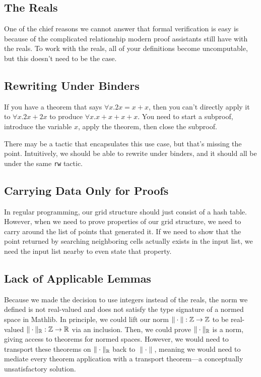 \documentclass{article}
\begin{document}
\subsection{The Reals}
One of the chief reasons we cannot answer that formal verification is easy is because of the complicated relationship modern proof assistants still have with the reals.
To work with the reals, all of your definitions become uncomputable, but this doesn't need to be the case.

\subsection{Rewriting Under Binders}
If you have a theorem that says $\forall x. 2x = x + x$, then you can't directly apply it to $\forall x. 2x + 2x$ to produce $\forall x. x + x + x + x$.
You need to start a subproof, introduce the variable $x$, apply the theorem, then close the subproof.

There may be a tactic that encapsulates this use case, but that's missing the point.
Intuitively, we should be able to rewrite under binders, and it should all be under the same \texttt{rw} tactic.

\subsection{Carrying Data Only for Proofs}
In regular programming, our grid structure should just consist of a hash table.
However, when we need to prove properties of our grid structure, we need to carry around the list of points that generated it.
If we need to show that the point returned by searching neighboring cells actually exists in the input list, we need the input list nearby to even state that property.

\subsection{Lack of Applicable Lemmas}
Because we made the decision to use integers instead of the reals, the norm we defined is not real-valued and does not satisfy the type signature of a normed space in Mathlib.  
In principle, we could lift our norm $\| \cdot \| : \mathbb{Z} \to \mathbb{Z}$ to be real-valued $\| \cdot \|_{\mathbb{R}} : \mathbb{Z} \to \mathbb{R}$ via an inclusion.
Then, we could prove $\| \cdot \|_{\mathbb{R}}$ is a norm, giving access to theorems for normed spaces.
However, we would need to transport these theorems on $\| \cdot \|_{\mathbb{R}}$ back to $\| \cdot \|$, meaning we would need to mediate every theorem application with a transport theorem---a conceptually unsatisfactory solution.
\end{document}
